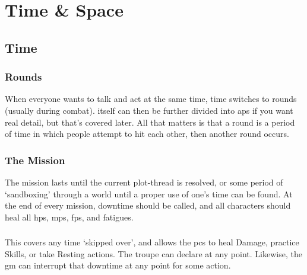 \pagebreak
\section{Time \& Space}

\begin{multicols}{2}

\subsection{Time}
\label{time}

\subsubsection{Rounds}

When everyone wants to talk and act at the same time, time switches to \glspl{round} (usually during combat).
 itself can then be further divided into \glspl{ap} if you want real detail, but that's covered later.
All that matters is that a \gls{round} is a period of time in which people attempt to hit each other, then another \gls{round} occurs.

\subsubsection{}
\label{intervals}



\subsubsection{The Mission}

The mission lasts until the current plot-thread is resolved, or some period of `sandboxing' through a world until a proper use of one's time can be found.
At the end of every mission, \gls{downtime} should be called, and all characters should heal all \glspl{hp}, \glspl{mp}, \glspl{fp}, and \glspl{fatigue}.

\subsubsection{}

This covers any time `skipped over', and allows the \glspl{pc} to heal Damage, practice Skills, or take Resting actions.
The troupe can declare  at any point.
Likewise, the \gls{gm} can interrupt that \gls{downtime} at any point for some action.


\end{multicols}
